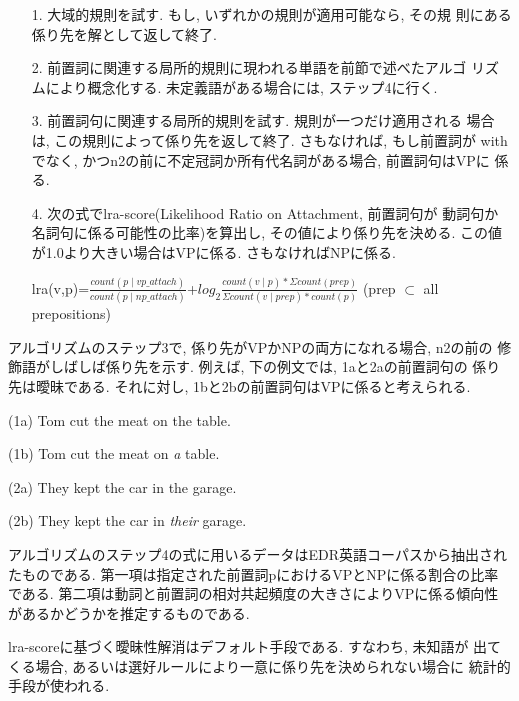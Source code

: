 \begin{itemize}
\item[1.] 大域的規則を試す. もし, いずれかの規則が適用可能なら, その規
則にある係り先を解として返して終了. 
\item[2.] 前置詞に関連する局所的規則に現われる単語を前節で述べたアルゴ
リズムにより概念化する. 未定義語がある場合には, ステップ4に行く. 
\item[3.] 前置詞句に関連する局所的規則を試す. 規則が一つだけ適用される
場合は, この規則によって係り先を返して終了. さもなければ, もし前置詞が
withでなく, かつn2の前に不定冠詞か所有代名詞がある場合, 前置詞句はVPに
係る. 
\item[4.] 次の式でlra-score(Likelihood Ratio on Attachment, 前置詞句が
動詞句か名詞句に係る可能性の比率)を算出し, その値により係り先を決める.
この値が1.0より大きい場合はVPに係る. さもなければNPに係る.

\vspace*{3mm}
\hspace*{2mm}lra(v,p)=$\frac{count(p \mid vp\_attach)}{count(p \mid
np\_attach)}$+$log_2$$        \frac{count(v \mid p) \ast \Sigma
count(prep)}	{\Sigma count(v \mid prep) \ast count(p)}$
\hspace*{6mm} (prep $\subset$ all prepositions) 
\end{itemize}

\vspace*{3mm}

アルゴリズムのステップ3で, 係り先がVPかNPの両方になれる場合, n2の前の
修飾語がしばしば係り先を示す. 例えば, 下の例文では, 1aと2aの前置詞句の
係り先は曖昧である. それに対し, 1bと2bの前置詞句はVPに係ると考えられる.

\vspace*{3mm}

(1a) Tom cut the meat on the table.


(1b) Tom cut the meat on {\it a} table.

\vspace{2mm}
(2a) They kept the car in the garage.


(2b) They kept the car in {\it their} garage.
\vspace*{3mm}

アルゴリズムのステップ4の式に用いるデータはEDR英語コーパスから抽出され
たものである. 第一項は指定された前置詞pにおけるVPとNPに係る割合の比率
である. 第二項は動詞と前置詞の相対共起頻度の大きさによりVPに係る傾向性
があるかどうかを推定するものである. 

lra-scoreに基づく曖昧性解消はデフォルト手段である. すなわち, 未知語が
出てくる場合, あるいは選好ルールにより一意に係り先を決められない場合に
統計的手段が使われる.  


